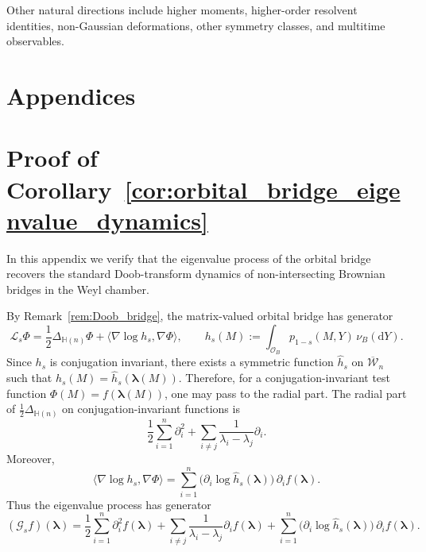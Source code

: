 \documentclass[11pt,a4paper]{article}
\theoremstyle{definition}\newtheorem{definition}[theorem]{Definition}
\theoremstyle{remark}\newtheorem{remark}[theorem]{Remark}
\numberwithin{equation}{section}
\newcommand{\dd}{\mathrm{d}}
\newcommand{\HH}{\mathbb{H}(n)}
\begin{document}
Other natural directions include higher moments, higher-order resolvent identities, non-Gaussian deformations, other symmetry classes, and multitime observables.

 


\appendix
\section*{Appendices}
 
 

 
\section{Proof of Corollary~\ref{cor:orbital_bridge_eigenvalue_dynamics}}
\label{app:orbital_bridge_generator}

In this appendix we verify that the eigenvalue process of the orbital bridge
recovers the standard Doob-transform dynamics of non-intersecting Brownian
bridges in the Weyl chamber.

By Remark~\ref{rem:Doob_bridge}, the matrix-valued orbital bridge has generator
\begin{equation}
\mathcal L_s\Phi
=
\frac12\Delta_{\HH}\Phi
+
\langle \nabla\log h_s,\nabla\Phi\rangle,
\qquad
h_s(M):=\int_{\mathcal O_B} p_{1-s}(M,Y)\,\nu_B(\dd Y).
\end{equation}
Since $h_s$ is conjugation invariant, there exists a symmetric function
$\widehat h_s$ on $\overline{\mathcal W}_n$ such that
$h_s(M)=\widehat h_s(\bm\lambda(M))$. Therefore, for a conjugation-invariant test function
$\Phi(M)=f(\bm\lambda(M))$, one may pass to the radial part. The radial part
of $\frac12\Delta_{\HH}$ on conjugation-invariant functions is
\begin{equation}
\frac12\sum_{i=1}^n \partial_i^2
+
\sum_{i\neq j}\frac{1}{\lambda_i-\lambda_j}\partial_i.
\end{equation}
Moreover,
\begin{equation}
\langle \nabla\log h_s,\nabla\Phi\rangle
=
\sum_{i=1}^n
\bigl(\partial_i\log\widehat h_s(\bm\lambda)\bigr)\,\partial_i f(\bm\lambda).
\end{equation}
Thus the eigenvalue process has generator
\begin{equation}
\label{eq:generator_radial_bridge_raw}
(\mathcal G_s f)(\bm\lambda)
=
\frac12\sum_{i=1}^n \partial_i^2 f(\bm\lambda)
+
\sum_{i\neq j}\frac{1}{\lambda_i-\lambda_j}\partial_i f(\bm\lambda)
+
\sum_{i=1}^n
\bigl(\partial_i\log\widehat h_s(\bm\lambda)\bigr)\,\partial_i f(\bm\lambda).
\end{equation}
\end{document}
